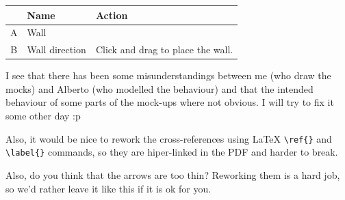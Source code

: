 \documentclass[12pt,a4paper]{article}
\begin{document}
\begin{table}[H]
\small
\centering
\begin{tabular}{c|p{5cm}|p{7cm}}
& Name & Action \\ \hline\hline
A
&Wall
&
\\B
&Wall direction
&Click and drag to place the wall.
\end{tabular}
\end{table}

\begin{todo}
I see that there has been some misunderstandings between me (who draw
the mocks) and Alberto (who modelled the behaviour) and that the
intended behaviour of some parts of the mock-ups where not obvious. I
will try to fix it some other day :p

Also, it would be nice to rework the cross-references using \LaTeX 
\verb|\ref{}| and \verb|\label{}| commands, so they are hiper-linked in
the PDF and harder to break.

Also, do you think that the arrows are too thin? Reworking them is a
hard job, so we'd rather leave it like this if it is ok for you.

\end{todo}

\newpage
\startappendix
\end{document}
